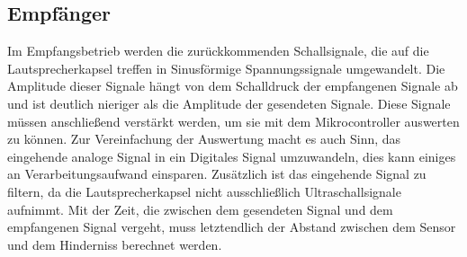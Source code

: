 \subsection{Empfänger}
Im Empfangsbetrieb werden die zurückkommenden Schallsignale, die auf die Lautsprecherkapsel treffen in Sinusförmige Spannungssignale umgewandelt. Die Amplitude dieser Signale hängt von dem Schalldruck der empfangenen Signale ab und ist deutlich nieriger als die Amplitude der gesendeten Signale. Diese Signale müssen anschließend verstärkt werden, um sie mit dem Mikrocontroller auswerten zu können. Zur Vereinfachung der Auswertung macht es auch Sinn, das eingehende analoge Signal in ein Digitales Signal umzuwandeln, dies kann einiges an Verarbeitungsaufwand einsparen. Zusätzlich ist das eingehende Signal zu filtern, da die Lautsprecherkapsel nicht ausschließlich Ultraschallsignale aufnimmt.
Mit der Zeit, die zwischen dem gesendeten Signal und dem empfangenen Signal vergeht, muss letztendlich der Abstand zwischen dem Sensor und dem Hinderniss berechnet werden.
